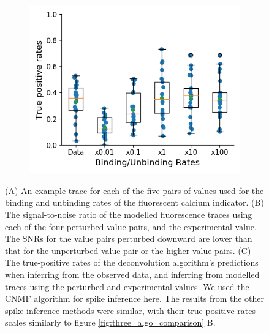 \begin{figure}[p]
\begin{subfigure}{0.45\textwidth}
        \includegraphics[width=\linewidth]{figures/calcium_chapter/b_i_f_i_perturbed_oasis_tp_paper.png}
        \caption{}
        \label{fig:rates_perturbed_inference}
    \end{subfigure}
    \caption{(A) An example trace for each of the five pairs of values used for the binding and unbinding rates of the fluorescent calcium indicator. (B) The signal-to-noise ratio of the modelled fluorescence traces using each of the four perturbed value pairs, and the experimental value. The SNRs for the value pairs perturbed downward are lower than that for the unperturbed value pair or the higher value pairs. (C) The true-positive rates of the deconvolution algorithm's predictions when inferring from the observed data, and inferring from modelled traces using the perturbed and experimental values. We used the CNMF algorithm for spike inference here. The results from the other spike inference methods were similar, with their true positive rates scales similarly to figure \ref{fig:three_algo_comparison} B.}
    \label{fig:rates_perturbed}
\end{figure}

